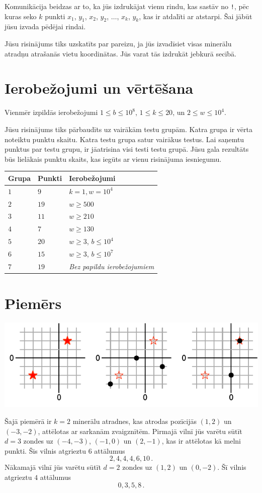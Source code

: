 Komunikācija beidzas ar to, ka jūs izdrukājat vienu rindu, kas sastāv no \texttt{!}, pēc kuras seko $k$ punkti $x_1$, $y_1$, $x_2$, $y_2$, $\ldots$, $x_k$, $y_k$, kas ir atdalīti ar atstarpi.
Šai jābūt jūsu izvada pēdējai rindai.

Jūsu risinājums tiks uzskatīts par pareizu, ja jūs izvadīsiet visas minerālu atradņu atrašanās vietu koordinātas.
Jūs varat tās izdrukāt jebkurā secībā.

\section*{Ierobežojumi un vērtēšana}

Vienmēr izpildās ierobežojumi
$1\leq b \leq 10^8$, %
$1 \leq k \leq 20$, %
un
$2 \le w \le 10^4$. %

Jūsu risinājums tiks pārbaudīts uz vairākām testu grupām. Katra grupa ir vērta noteiktu punktu skaitu.
Katra testu grupa satur vairākus testus.
Lai saņemtu punktus par testu grupu, ir jāatrisina visi testi testu grupā.
Jūsu gala rezultāts būs lielākais punktu skaits, kas iegūts ar vienu risinājuma iesniegumu.

\medskip
\begin{tabular}{lll}
Grupa & Punkti & Ierobežojumi \\\hline
  $1$ & $9$ & $k = 1, w = 10^4$\\
  $2$ & $19$ & $w \ge 500$\\
  $3$ & $11$ & $w \ge 210$\\
  $4$ & $7$ & $w \ge 130$\\
  $5$ & $20$ & $w \ge 3$, $b \le 10^4$\\
  $6$ & $15$ & $w \ge 3$, $b \le 10^7$\\
  $7$ & $19$ & \emph{Bez papildu ierobežojumiem}
\end{tabular}

\section*{Piemērs}

\includegraphics[width=.6\textwidth]{img/sample1.pdf}

Šajā piemērā ir $k=2$ minerālu atradnes, kas atrodas pozīcijās $(1,2)$ un $(-3,-2)$, attēlotas ar sarkanām zvaigznītēm.
Pirmajā vilnī jūs varētu sūtīt $d=3$ zondes uz $(-4,-3)$, $(-1, 0)$ un $(2,-1)$, kas ir attēlotas kā melni punkti.
Šis vilnis atgrieztu $6$ attālumus \[
  2, 4, 4, 4, 6, 10\,.
\]
Nākamajā vilnī jūs varētu sūtīt $d=2$ zondes uz $(1,2)$ un $(0,-2)$.
Šī vilnis atgrieztu $4$ attālumus \[
  0, 3, 5, 8\,.
\]
